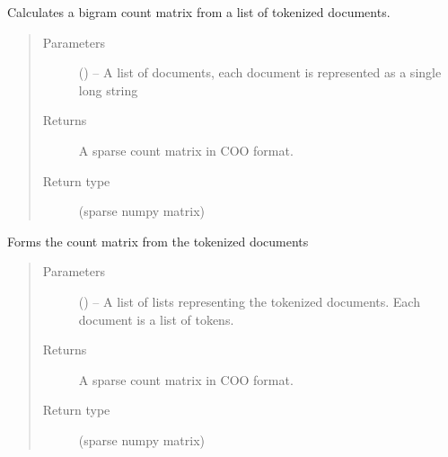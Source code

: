 \documentclass[letterpaper,10pt,english]{sphinxmanual}
\begin{document}
\begin{fulllineitems}
\begin{fulllineitems}
\label{\detokenize{KUHERD:KUHERD.HerdVectorizer.HerdVectorizer.form_bigram_count_matrix}}
Calculates a bigram count matrix from a list of tokenized documents.
\begin{quote}\begin{description}
\item[{Parameters}] \leavevmode
{} () -- A list of documents, each document is represented as a single long string

\item[{Returns}] \leavevmode
A sparse count matrix in COO format.

\item[{Return type}] \leavevmode
(sparse numpy matrix)

\end{description}\end{quote}

\end{fulllineitems}


\begin{fulllineitems}
\label{\detokenize{KUHERD:KUHERD.HerdVectorizer.HerdVectorizer.form_count_matrix}}
Forms the count matrix from the tokenized documents
\begin{quote}\begin{description}
\item[{Parameters}] \leavevmode
{} () -- A list of lists representing the tokenized documents. Each document is a list of tokens.

\item[{Returns}] \leavevmode
A sparse count matrix in COO format.

\item[{Return type}] \leavevmode
(sparse numpy matrix)

\end{description}\end{quote}

\end{fulllineitems}



\end{fulllineitems}
\end{document}
